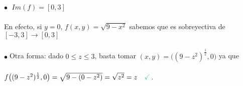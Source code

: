 \documentclass{article}
\theoremstyle{definition}
\theoremstyle{definition}
\theoremstyle{remark}
\newcommand\bl{$\bullet\;$}
\newcommand\ok{\checkmark}
\begin{document}
\begin{figure}[h]
\centering
\def\svgwidth{1\textwidth}

\end{figure}
\; 
\textcolor{rojop2}{\bl} $Im(f)=[0,3]$ \\\\ En efecto, si $y=0$, $f(x,y) = \sqrt{9-x^2}$ sabemos que es sobreyectiva de \mbox{$[-3,3] \to [0,3]$} \\\\ \bl Otra forma: dado $0 \leq z \leq 3$, basta tomar $(x,y)=\big((9-z^2)^{\frac{1}{2}},0\big)$ ya que  \\ \\ $f\big((9-z^2)^\frac{1}{2},0\big)=\sqrt{9-(0-z^2)}=\sqrt{z^2}=z \quad \textcolor{verdep2}{\ok}$.


\begin{figure}[h]
\centering
\def\svgwidth{1\textwidth}

\end{figure} \; 
\pagebreak \\
\end{document}
